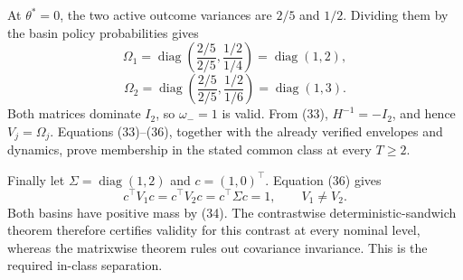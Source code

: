 At \(\theta^*=0\), the two active outcome variances are \(2/5\) and \(1/2\).  Dividing them by the basin policy probabilities gives
\[
 \Omega_1=\operatorname{diag}\!\left(\frac{2/5}{2/5},\frac{1/2}{1/4}\right)
 =\operatorname{diag}(1,2),
\]
\[
 \Omega_2=\operatorname{diag}\!\left(\frac{2/5}{2/5},\frac{1/2}{1/6}\right)
 =\operatorname{diag}(1,3).                                               \tag{36}
\]
Both matrices dominate \(I_2\), so \(\omega_-=1\) is valid.  From (33), \(H^{-1}=-I_2\), and hence \(V_j=\Omega_j\).  Equations (33)--(36), together with the already verified envelopes and dynamics, prove membership in the stated common class at every \(T\ge2\).

Finally let \(\Sigma=\operatorname{diag}(1,2)\) and \(c=(1,0)^\top\).  Equation (36) gives
\[
 c^\top V_1c=c^\top V_2c=c^\top\Sigma c=1,
 \qquad V_1\ne V_2.
\]
Both basins have positive mass by (34).  The contrastwise deterministic-sandwich theorem therefore certifies validity for this contrast at every nominal level, whereas the matrixwise theorem rules out covariance invariance.  This is the required in-class separation.